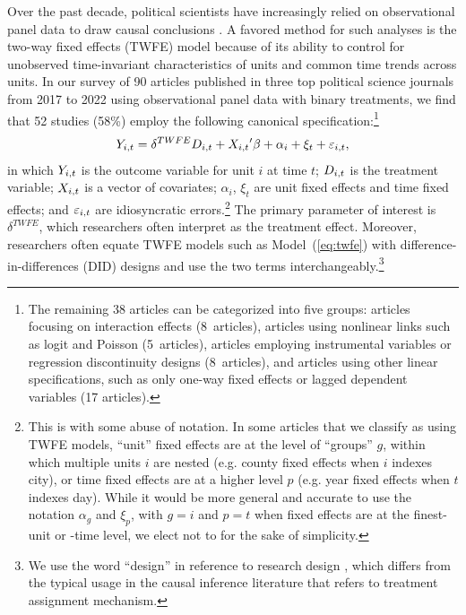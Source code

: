 \documentclass[12pt]{article}
\begin{document}
Over the past decade, political scientists have increasingly relied on observational panel data to draw causal conclusions \citep{Xu2023}. A favored method for such analyses is the two-way fixed effects (TWFE) model because of its ability to control for unobserved time-invariant characteristics of units and common time trends across units. In our survey of 90 articles published in three top political science journals from 2017 to 2022 using observational panel data with binary treatments, we find that 52 studies (58\%) employ the following canonical specification:\footnote{The remaining 38 articles can be categorized into five groups: articles focusing on interaction effects (8~articles), articles using nonlinear links such as logit and Poisson (5~articles), articles employing instrumental variables or regression discontinuity designs (8~articles), and articles using other linear specifications, such as only one-way fixed effects or lagged dependent variables (17 articles).}
\vspace{-0.5em}\begin{equation}\label{eq:twfe} 
  \Yit = \delta^{TWFE}\Dit + \Xit{'}\beta + \alpha_i + \xi_t + \epit, 
  \vspace{-0.5em}
\end{equation}
in which $Y_{i,t}$ is the outcome variable for unit $i$ at time $t$; $D_{i,t}$ is the treatment variable; $X_{i,t}$ is a vector of covariates; $\alpha_{i}$, $\xi_{t}$ are unit fixed effects and time fixed effects; and $\varepsilon_{i,t}$ are idiosyncratic errors.\footnote{This is with some abuse of notation. In some articles that we classify as using TWFE models, ``unit'' fixed effects are at the level of ``groups'' $g$, within which multiple units $i$ are nested (e.g. county fixed effects when $i$ indexes city), or time fixed effects are at a higher level $p$ (e.g. year fixed effects when $t$ indexes day). While it would be more general and accurate to use the notation $\alpha_g$ and $\xi_p$, with $g=i$ and $p=t$ when fixed effects are at the finest-unit or -time level, we elect not to for the sake of simplicity.} The primary parameter of interest is $\delta^{TWFE}$, which researchers often interpret as the treatment effect. Moreover, researchers often equate TWFE models such as Model~(\ref{eq:twfe}) with difference-in-differences (DID) designs and use the two terms interchangeably.\footnote{We use the word ``design'' in reference to research design \citep{king2021designing}, which differs from the typical usage in the causal inference literature that refers to treatment assignment mechanism.}
\end{document}
